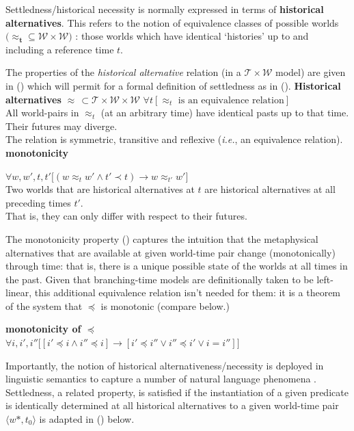 \documentclass[12pt,dvipsnames]{report}
\begin{document}
Settledness/historical necessity is normally expressed in terms of \textbf{historical alternatives}. This refers to the notion of equivalence classes of possible worlds $\boldsymbol{(\approx_{t}}\subseteq\mathcal{W\times W})$ : those worlds which have identical `histories' up to and including a reference time $t$. 

The properties of the \textit{historical alternative} relation (in a $ \mathcal{T\times W} $ model) are given in (\nextx) which will permit for a formal definition of settledness as in (\anextx).
	\pex \textbf{Historical alternatives} $\boldsymbol\approx\,\subset\mathcal{T\times W\times W}$
	\a $\forall t[\approx_t\text{ is an equivalence relation}]$\\
	All world-pairs in $\approx_t$ (at an arbitrary time) have identical pasts up to that time.\\Their futures may diverge.\\
	The relation is symmetric, transitive and reflexive (\textit{i.e.}, an equivalence relation).
	\a \textbf{monotonicity}
	
	 $ \forall w,w',t,t'\big[(w\approx_t w'\wedge t'\prec t)\to w\approx_{t'} w'\big]$\\
	Two worlds that are historical alternatives at $t$ are historical alternatives at all preceding times $t'$.\\That is, they can only differ with respect to their futures.
	\xe

The monotonicity property () captures the intuition that the metaphysical alternatives that are available at given world-time pair change (monotonically) through time: that is, there is a unique possible state of the worlds at all times in the past.  Given that branching-time models are definitionally taken to be left-linear, this additional equivalence relation isn't needed for them: it is a theorem of the system that $ \preccurlyeq $ is monotonic (compare  below.)

\pex[exno=\getref{histaltdef}]
\a[label=b′] \textbf{monotonicity of $ \boldsymbol\preccurlyeq $}\\$ \forall i,i',i''\big[[i'\preccurlyeq i\wedge i''\preccurlyeq i]\to [i'\preccurlyeq i'' \vee i'' \preccurlyeq i' \vee i=i'']\big] $
\xe


Importantly, the notion of historical alternativeness/necessity is deployed in linguistic semantics to capture a number of natural language phenomena \citep[e.g.,][]{Thomason1984,Condoravdi2002,Kaufmann2002}. Settledness, a related property, is satisfied if the instantiation of a given predicate is identically determined at all historical alternatives to a given world-time pair $\langle w*,t_0\rangle $ is adapted in () below.
\end{document}
